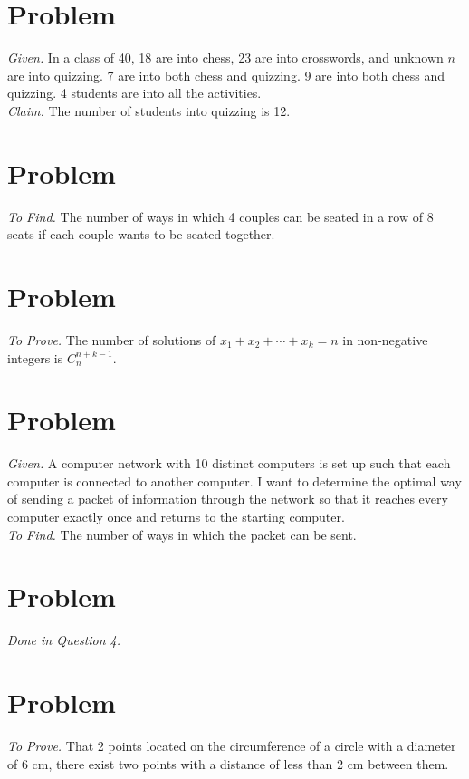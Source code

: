 \documentclass[11pt]{article}
\begin{document}
\section{Problem}
\emph{Given. } In a class of 40, 18 are into chess, 23 are into crosswords, and unknown $n$ are into quizzing. 7 are into both chess and quizzing. 9 are into both chess and quizzing. 4 students are into all the activities. \medskip \\
\emph{Claim. } The number of students into quizzing is 12.






\section{Problem}
\emph{To Find. } The number of ways in which 4 couples can be seated in a row of 8 seats if each couple wants to be seated together.





\section{Problem}
\emph{To Prove. } The number of solutions of $x_1 + x_2 + \cdots + x_k = n$ in non-negative integers is $C^{n+k−1}_n$.





\section{Problem}
\emph{Given. } A computer network with 10 distinct computers is set up such that each computer is connected to another computer. I want to determine the optimal way of sending a packet of information through the network so that it reaches every computer exactly once and returns to the starting computer.
\medskip \\
\emph{To Find. } The number of ways in which the packet can be sent.



\section{Problem} \emph{Done in Question 4.} \medskip \\




\section{Problem} \emph{To Prove. } That 2 points located on the circumference of a circle with a diameter of 6 cm, there exist two points with a distance of less than 2 cm between them.
\end{document}
